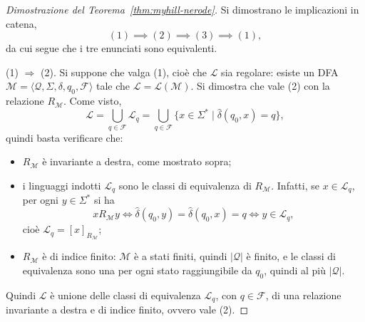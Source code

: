 \documentclass[a4paper, 11pt, oneside]{book}
\theoremstyle{formale}
\begin{document}
    \begin{proof}[Dimostrazione del Teorema~\ref{thm:myhill-nerode}]
        Si dimostrano le implicazioni in catena,
        \begin{equation*}
            (1) \implies (2) \implies (3) \implies (1),
        \end{equation*}
        da cui segue che i tre enunciati sono equivalenti.

        \textsc{(1)} $\Rightarrow$ \textsc{(2)}. Si suppone che valga (1), cio\`e che
        $\mathcal{L}$ sia regolare: esiste un DFA
        $\mathcal{M} = \langle \mathcal{Q}, \Sigma, \delta, q_0, \mathcal{F} \rangle$ tale
        che $\mathcal{L} = \mathcal{L}(\mathcal{M})$. Si dimostra che vale (2) con la
        relazione $R_{\mathcal{M}}$. Come visto,
        \begin{equation*}
            \mathcal{L} = \bigcup_{q \in \mathcal{F}} \mathcal{L}_q
            = \bigcup_{q \in \mathcal{F}} \{x \in \Sigma^* \mid \hat{\delta}(q_0, x) = q\},
        \end{equation*}
        quindi basta verificare che:
        \begin{itemize}
            \item $R_{\mathcal{M}}$ \`e invariante a destra, come mostrato sopra;
            \item i linguaggi indotti $\mathcal{L}_q$ sono le classi di equivalenza di
                $R_{\mathcal{M}}$. Infatti, se $x \in \mathcal{L}_q$, per ogni
                $y \in \Sigma^*$ si ha
                \begin{equation*}
                    x \mathrel{R_{\mathcal{M}}} y
                    \iff \hat{\delta}(q_0, y) = \hat{\delta}(q_0, x) = q
                    \iff y \in \mathcal{L}_q,
                \end{equation*}
                cio\`e $\mathcal{L}_q = [x]_{R_{\mathcal{M}}}$;
            \item $R_{\mathcal{M}}$ \`e di indice finito: $\mathcal{M}$ \`e a stati finiti,
                quindi $|\mathcal{Q}|$ \`e finito, e le classi di equivalenza sono una per
                ogni stato raggiungibile da $q_0$, quindi al pi\`u
                $|\mathcal{Q}|$.
        \end{itemize}
        Quindi $\mathcal{L}$ \`e unione delle classi di equivalenza $\mathcal{L}_q$, con
        $q \in \mathcal{F}$, di una relazione invariante a destra e di indice finito,
        ovvero vale (2).


\end{proof}
\end{document}
